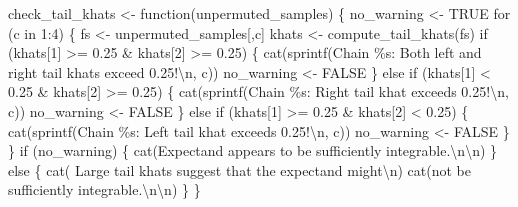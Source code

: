 \documentclass[
  letterpaper,
  DIV=11,
  numbers=noendperiod]{scrartcl}
\newenvironment{Shaded}{\begin{snugshade}}{\end{snugshade}}
\newcommand{\ConstantTok}[1]{\textcolor[rgb]{0.56,0.35,0.01}{#1}}
\newcommand{\ControlFlowTok}[1]{\textcolor[rgb]{0.00,0.23,0.31}{#1}}
\newcommand{\DecValTok}[1]{\textcolor[rgb]{0.68,0.00,0.00}{#1}}
\newcommand{\FloatTok}[1]{\textcolor[rgb]{0.68,0.00,0.00}{#1}}
\newcommand{\FunctionTok}[1]{\textcolor[rgb]{0.28,0.35,0.67}{#1}}
\newcommand{\NormalTok}[1]{\textcolor[rgb]{0.00,0.23,0.31}{#1}}
\newcommand{\OtherTok}[1]{\textcolor[rgb]{0.00,0.23,0.31}{#1}}
\newcommand{\SpecialCharTok}[1]{\textcolor[rgb]{0.37,0.37,0.37}{#1}}
\newcommand{\StringTok}[1]{\textcolor[rgb]{0.13,0.47,0.30}{#1}}
\begin{document}
\begin{Shaded}
\begin{Highlighting}[]
\NormalTok{check\_tail\_khats }\OtherTok{\textless{}{-}} \ControlFlowTok{function}\NormalTok{(unpermuted\_samples) \{}
\NormalTok{  no\_warning }\OtherTok{\textless{}{-}} \ConstantTok{TRUE}
  \ControlFlowTok{for}\NormalTok{ (c }\ControlFlowTok{in} \DecValTok{1}\SpecialCharTok{:}\DecValTok{4}\NormalTok{) \{}
\NormalTok{    fs }\OtherTok{\textless{}{-}}\NormalTok{ unpermuted\_samples[,c]}
\NormalTok{    khats }\OtherTok{\textless{}{-}} \FunctionTok{compute\_tail\_khats}\NormalTok{(fs)}
    \ControlFlowTok{if}\NormalTok{ (khats[}\DecValTok{1}\NormalTok{] }\SpecialCharTok{\textgreater{}=} \FloatTok{0.25} \SpecialCharTok{\&}\NormalTok{ khats[}\DecValTok{2}\NormalTok{] }\SpecialCharTok{\textgreater{}=} \FloatTok{0.25}\NormalTok{) \{}
      \FunctionTok{cat}\NormalTok{(}\FunctionTok{sprintf}\NormalTok{(}\StringTok{\textquotesingle{}Chain \%s: Both left and right tail khats exceed 0.25!}\SpecialCharTok{\textbackslash{}n}\StringTok{\textquotesingle{}}\NormalTok{,}
\NormalTok{                   c))}
\NormalTok{      no\_warning }\OtherTok{\textless{}{-}} \ConstantTok{FALSE}
\NormalTok{    \} }\ControlFlowTok{else} \ControlFlowTok{if}\NormalTok{ (khats[}\DecValTok{1}\NormalTok{] }\SpecialCharTok{\textless{}} \FloatTok{0.25} \SpecialCharTok{\&}\NormalTok{ khats[}\DecValTok{2}\NormalTok{] }\SpecialCharTok{\textgreater{}=} \FloatTok{0.25}\NormalTok{) \{}
      \FunctionTok{cat}\NormalTok{(}\FunctionTok{sprintf}\NormalTok{(}\StringTok{\textquotesingle{}Chain \%s: Right tail khat exceeds 0.25!}\SpecialCharTok{\textbackslash{}n}\StringTok{\textquotesingle{}}\NormalTok{, c))}
\NormalTok{      no\_warning }\OtherTok{\textless{}{-}} \ConstantTok{FALSE}
\NormalTok{    \} }\ControlFlowTok{else} \ControlFlowTok{if}\NormalTok{ (khats[}\DecValTok{1}\NormalTok{] }\SpecialCharTok{\textgreater{}=} \FloatTok{0.25} \SpecialCharTok{\&}\NormalTok{ khats[}\DecValTok{2}\NormalTok{] }\SpecialCharTok{\textless{}} \FloatTok{0.25}\NormalTok{) \{}
      \FunctionTok{cat}\NormalTok{(}\FunctionTok{sprintf}\NormalTok{(}\StringTok{\textquotesingle{}Chain \%s: Left tail khat exceeds 0.25!}\SpecialCharTok{\textbackslash{}n}\StringTok{\textquotesingle{}}\NormalTok{, c))}
\NormalTok{      no\_warning }\OtherTok{\textless{}{-}} \ConstantTok{FALSE}
\NormalTok{    \}}
\NormalTok{  \}}
  \ControlFlowTok{if}\NormalTok{ (no\_warning) \{}
    \FunctionTok{cat}\NormalTok{(}\StringTok{\textquotesingle{}Expectand appears to be sufficiently integrable.}\SpecialCharTok{\textbackslash{}n\textbackslash{}n}\StringTok{\textquotesingle{}}\NormalTok{)}
\NormalTok{  \} }\ControlFlowTok{else}\NormalTok{ \{}
    \FunctionTok{cat}\NormalTok{(}\StringTok{\textquotesingle{}  Large tail khats suggest that the expectand might}\SpecialCharTok{\textbackslash{}n}\StringTok{\textquotesingle{}}\NormalTok{)}
    \FunctionTok{cat}\NormalTok{(}\StringTok{\textquotesingle{}not be sufficiently integrable.}\SpecialCharTok{\textbackslash{}n\textbackslash{}n}\StringTok{\textquotesingle{}}\NormalTok{)}
\NormalTok{  \}}
\NormalTok{\}}
\end{Highlighting}
\end{Shaded}
\end{document}
